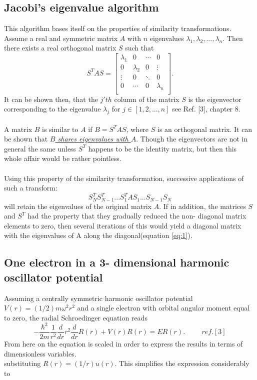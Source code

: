 \documentclass[10pt,a4paper]{article}
\begin{document}
\subsection{Jacobi's eigenvalue algorithm}\label{jacobi algo}
This algorithm bases itself on the properties of similarity transformations. Assume a real and symmetric matrix $A$ with $n$ eigenvalues $\lambda_1,\lambda_2,...,\lambda_n$. Then there exists a real orthogonal matrix $S$ such that
\begin{equation}\label{eq:1}
S^TAS=\begin{bmatrix}
\lambda_1 & 0 & \cdots & 0 \\
0 & \lambda_2 & 0 & \vdots \\
\vdots & 0 & \ddots & 0 \\
0 & \cdots & 0 & \lambda_n \\
\end{bmatrix}.
\end{equation}
It can be shown then, that the $j'th$ column of the matrix $S$ is the eigenvector corresponding to the eigenvalue $\lambda_j$ for $j \in [1,2,...,n]$ see Ref. [3], chapter 8.\\\\A matrix $B$ is similar to $A$ if $B=S^{T}AS$, where $S$ is an orthogonal matrix. It can be shown that \hyperref[proof of same eigenvalues]{\emph{$B$ shares eigenvalues with $A$}}. Though the eigenvectors are not in general the same unless $S^T$ happens to be the identity matrix, but then this whole affair would be rather pointless.\\\\Using this property of the similarity transformation, successive applications of such a transform:
$$
S_N^TS_{N-1}^T...S_1^TAS_1...S_{N-1}S_N
$$
will retain the eigenvalues of the original matrix $A$. If in addition, the matrices $S$ and $S^T$ had the property that they gradually reduced the non- diagonal matrix elements to zero, then several iterations of this would yield a diagonal matrix with the eigenvalues of A along the diagonal(equation \ref{eq:1}).
\subsection{One electron in a 3- dimensional harmonic oscillator potential}
Assuming a centrally symmetric harmonic oscillator potential $V(r) = (1/2)m\omega^2r^2$ and a single electron with orbital angular moment equal to zero, the radial Schroedinger equation reads
\begin{equation*}
-\frac{\hbar^2}{2 m} \frac{1}{r^2} \frac{d}{dr} r^2\frac{d}{dr}R(r)+ V(r) R(r) = E R(r). \hspace{1cm} ref.[3]
\end{equation*}
From here on the equation is scaled in order to express the results in terms of dimensionless variables.\\
substituting $R(r) = (1/r) u(r)$. This simplifies the expression considerably to
\end{document}
